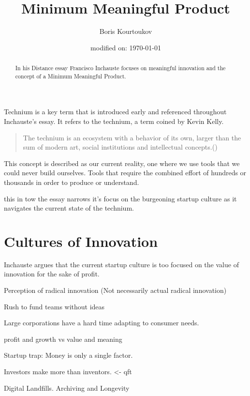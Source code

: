 
\newcommand{\latestKnownVersion}[1]{v0-01}
\title{Minimum Meaningful Product}
\author{Boris Kourtoukov}
\date{modified on: \today}

\maketitle

\begin{abstract}
\noindent
In his Distance essay Francisco Inchauste focuses on meaningful innovation and the concept of a Minimum Meaningful Product.
\end{abstract}

Technium is a key term that is introduced early and referenced throughout Inchauste's essay. It refers to the technium, a term coined by Kevin Kelly.
\begin{quote}
	The technium is an ecosystem with a behavior of its own, larger than the sum of modern art, social institutions and intellectual concepts.()
\end{quote}

This concept is described as our current reality, one where we use tools that we could never build ourselves. Tools that require the combined effort of hundreds or thousands in order to produce or understand. 

 this in tow the essay narrows it's focus on the burgeoning startup culture as it navigates the current state of the technium. 


\section{Cultures of Innovation}

Inchauste argues that the current startup culture is too focused on the value of innovation for the sake of profit.

Perception of radical innovation (Not necessarily actual radical innovation)

Rush to fund teams without ideas

Large corporations have a hard time adapting to consumer needs.

profit and growth vs value and meaning

Startup trap: Money is only a single factor.

Investors make more than inventors. <- qft

Digital Landfills. Archiving and Longevity

